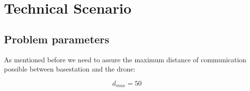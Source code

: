 \chapter*{Technical Scenario}\label{ch:technical_scenario}

\section*{Problem parameters}
As mentioned before we need to assure the maximum distance of communication possible between basestation and the drone:

\begin{equation*}\label{eq:tech_parameter1} 
 		d_{max} = 50
\end{equation*}
